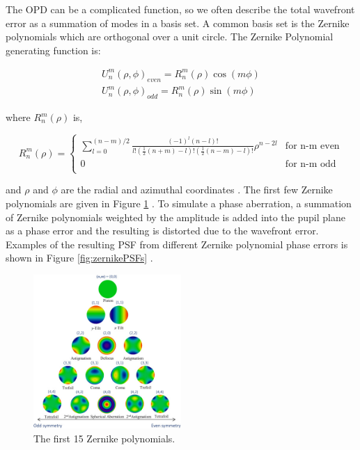 The OPD can be a complicated function, so we often describe the total wavefront error as a summation of modes in a basis set. A common basis set is the Zernike polynomials which are orthogonal over a unit circle. The Zernike Polynomial generating function is:

\begin{equation}
    \begin{split}
        U_n^m(\rho,\phi)_{even}=R_n^m(\rho)\cos(m\phi) \\
        U_n^m(\rho,\phi)_{odd}=R_n^m(\rho)\sin(m\phi)
    \end{split}
\end{equation}

\noindent where $R_n^m(\rho)$ is,

\[ 
R_n^m(\rho)= \left\{
\begin{array}{cr}
       {\sum_{l=0}^{(n-m)/2} \frac{(-1)^l(n-l)!}{l!(\frac{1}{2}(n+m)-l)!(\frac{1}{2}(n-m)-l)!}\rho^{n-2l}} &  \mbox{for n-m even} \\
        {0} &  \mbox{for n-m odd} \\
\end{array} 
\right. 
\]

\noindent and $\rho$ and $\phi$ are the radial and azimuthal coordinates \citep{weisstein2002zernike}. The first few Zernike polynomials are given in Figure \ref{fig:zernikes} \citep{Hsieh:20}. To simulate a phase aberration, a summation of Zernike polynomials weighted by the amplitude is added into the pupil plane as a phase error and the resulting is distorted due to the wavefront error. Examples of the resulting PSF from different Zernike polynomial phase errors is shown in Figure \ref{fig:zernikePSFs} \citep{masalehdan2010modeling}.

\begin{figure}[h]
    \centering
    \includegraphics[width=0.5\textwidth]{Chapter Materials/Introduction Materials/Introduction Figures/zernikes.jpeg}
    \caption{The first 15 Zernike polynomials.}
    \label{fig:zernikes}
\end{figure}


